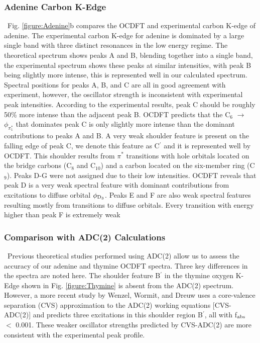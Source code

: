\documentclass[12pt]{article}
\begin{document}
\subsubsection{Adenine Carbon K-Edge}
\ Fig. \ref{figure:Adenine}b compares the OCDFT and experimental carbon K-edge of adenine. The experimental carbon K-edge for adenine is dominated by a large single band with three distinct resonances in the low energy regime. The theoretical spectrum shows peaks A and B, blending together into a single band, the experimental spectrum shows these peaks at similar intensities, with peak B being slightly more intense, this is represented well in our calculated spectrum. Spectral positions for peaks A, B, and C are all in good agreement with experiment, 
however, the oscillator strength is inconsistent with experimental peak intensities. According to the experimental results, peak C should be roughly 50\% more intense than the adjacent peak B. OCDFT predicts that the C$_6$ $\rightarrow$ $\phi_{\pi^*_1}$ that dominates peak C is only slightly more intense than the dominant contributions to peaks A and B. A very weak shoulder feature is present on the falling edge of peak C, we denote this feature as C$^{\prime}$ and it is represented well by OCDFT. This shoulder results from $\pi^*$ transitions with hole orbitals located on the bridge carbons (C$_8$ and C$_{10}$) and a carbon located on the six-member ring (C$_9$). Peaks D-G were not assigned due to their low intensities. OCDFT reveals that peak D is a very weak spectral feature with dominant contributions from excitations to diffuse orbital $\phi_{\rm D_3}$. Peaks E and F are also weak spectral features resulting mostly from transitions to diffuse orbitals. Every transition with energy higher than peak F is extremely weak 

\subsubsection{Comparison with ADC(2) Calculations} \
Previous theoretical studies performed using ADC(2) allow us to assess the accuracy of our adenine and thymine OCDFT spectra. Three key differences in the spectra are noted here. 
The shoulder feature B$^{\prime}$ in the thymine oxygen K-Edge shown in Fig. \ref{figure:Thymine} is absent from the ADC(2) spectrum.\cite{plekan_theoretical_2008} However, a more recent study by Wenzel, Wormit, and Dreuw \cite{wenzel_calculating_2014} uses a core-valence separation (CVS) approximation to the ADC(2) working equations [CVS-ADC(2)] and predicts three excitations in this shoulder region B$^{\prime}$, all with f$_{\rm abs}$ $<$ 0.001. These weaker oscillator strengths predicted by CVS-ADC(2) are more consistent with the experimental peak profile.
\end{document}
